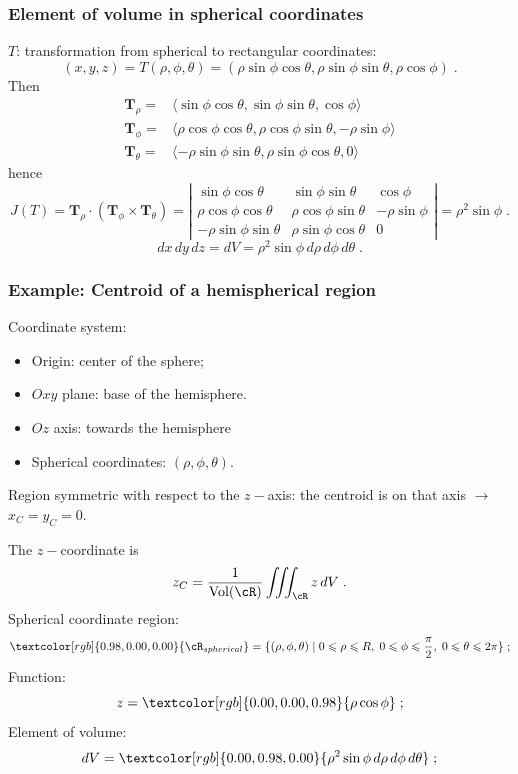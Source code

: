 \begin{frame}
    \frametitle{Element of volume in spherical coordinates}

$T$:  transformation from spherical to rectangular coordinates:
%
$$(x,y,z) = T(\rho, \phi, \theta) = (\rho \sin\phi \cos\theta, \rho \sin\phi\sin\theta, \rho \cos\phi)\; .$$
%
Then
%
\begin{align*}
  \textbf{T}_{\rho} = & \langle \sin\phi \cos\theta, \sin\phi\sin\theta, \cos\phi\rangle \\
  \textbf{T}_{\phi} = & \langle \rho\cos\phi \cos\theta, \rho\cos\phi\sin\theta, - \rho\sin\phi\rangle \\
  \textbf{T}_{\theta} = & \langle -\rho \sin\phi \sin\theta, \rho \sin\phi\cos\theta, 0\rangle
\end{align*}
%
hence
%
$$J(T) = \textbf{T}_{\rho} \cdot (\textbf{T}_{\phi} \times \textbf{T}_{\theta}) = \left|
\begin{array}{ccc}
  \sin\phi \cos\theta &  \sin\phi\sin\theta & \cos\phi \\
  \rho\cos\phi \cos\theta & \rho\cos\phi\sin\theta & - \rho\sin\phi \\
  -\rho \sin\phi \sin\theta &  \rho \sin\phi\cos\theta & 0
\end{array}\right| = \rho^2\sin\phi\; .$$
%
$$dx\, dy\, dz = dV = \rho^2\sin\phi\,  d\rho\, d\phi\, d\theta\; .$$
\end{frame}

\begin{frame}
    \frametitle{Example: Centroid of a hemispherical region}

Coordinate system: 
%
\begin{itemize}
\item Origin: center of the sphere;
\item $Oxy$ plane: base of the hemisphere.
\item $Oz$ axis: towards the hemisphere
\item Spherical coordinates: $(\rho, \phi, \theta)$.
\end{itemize}

Region symmetric with respect to the $z-$axis: the centroid is on that axis $\to$ $x_C=y_C=0$. 

The $z-$coordinate is
%
$$z_C = \frac{1}{\text{Vol}(\cR)} \int\!\!\!\int\!\!\!\int_{\cR} z\, dV\; .$$
%
Spherical coordinate \textcolor[rgb]{0.98,0.00,0.00}{region}:
%
$$\textcolor[rgb]{0.98,0.00,0.00}{\cR_{spherical}} = \{ (\rho, \phi, \theta) \; | \; 0 \leqslant \rho \leqslant R,\; 0 \leqslant \phi \leqslant \frac{\pi}{2}, \; 0 \leqslant \theta \leqslant 2\pi \}\; ;$$
%
\textcolor[rgb]{0.00,0.00,0.98}{Function}:
%
$$z= \textcolor[rgb]{0.00,0.00,0.98}{\rho \cos\phi} \; ;$$
%
\textcolor[rgb]{0.00,0.98,0.00}{Element of volume}:
%
$$dV = \textcolor[rgb]{0.00,0.98,0.00}{\rho^2 \sin\phi \, d\rho\, d\phi\, d\theta}\; ;$$
\end{frame}

